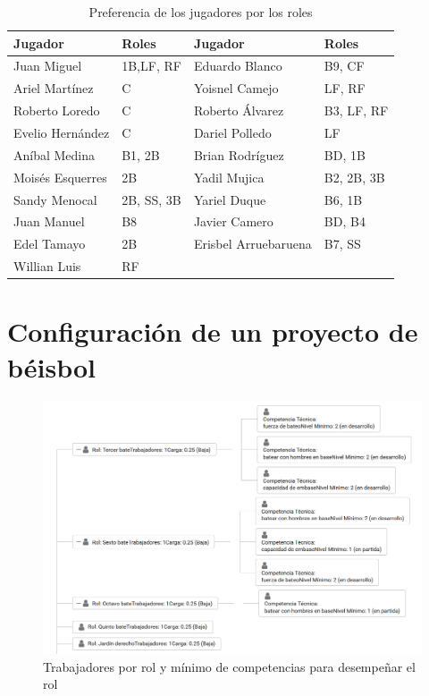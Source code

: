 {\begin{table}[H]
	\centering
	\caption{Preferencia de los jugadores por los roles}\label{table:pref-pers-roles-pel2}
	\begin{tabular}{l l  l l}
		\toprule
		\textbf{Jugador} & \textbf{Roles} & \textbf{Jugador}     & \textbf{Roles} \\ \midrule
		Juan Miguel      & 1B,LF, RF      & Eduardo Blanco       & B9, CF \\ \hline
		Ariel Martínez   & C              & Yoisnel Camejo       & LF, RF         \\ \hline
		Roberto Loredo   & C              & Roberto Álvarez      & B3, LF, RF     \\ \hline
		Evelio Hernández & C              & Dariel Polledo       & LF             \\ \hline
		Aníbal Medina    & B1, 2B         & Brian Rodríguez      & BD, 1B         \\ \hline
		Moisés Esquerres & 2B             & Yadil Mujica         & B2, 2B, 3B     \\ \hline
		Sandy Menocal    & 2B, SS, 3B     & Yariel Duque         & B6, 1B \\ \hline
		Juan Manuel      & B8             & Javier Camero        & BD, B4 \\ \hline
		Edel Tamayo      & 2B             & Erisbel Arruebaruena & B7, SS \\ \hline
		Willian Luis     & RF             &                      &  \\ \bottomrule
	\end{tabular}
\end{table}

\chapter{Configuración de un proyecto de béisbol}
\begin{figure}[H]
	\centering
	\includegraphics[width=\textwidth]{figuras/beisbol_conf_problema1.png}
	\caption{Trabajadores por rol y mínimo de competencias para desempeñar el rol} \label{fig:conf-equipo-pelota1}
\end{figure}

}
